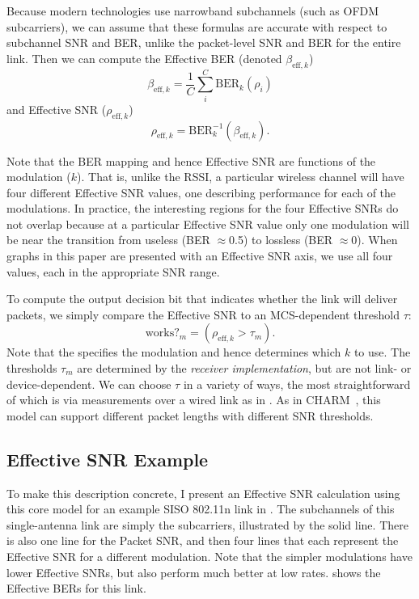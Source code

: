 Because modern technologies use narrowband subchannels (such as OFDM subcarriers), we can assume that these formulas are accurate with respect to subchannel SNR and BER, unlike the packet-level SNR and BER for the entire link. Then we can compute the Effective BER (denoted $\beta_{\text{eff},k}$)
\begin{equation}
	\label{eq:effective_ber}
	\beta_{\text{eff},k} = \frac{1}{C} \sum_{i}^{C} \text{BER}_k(\rho_i)
\end{equation}
and Effective SNR ($\rho_{\text{eff},k}$)
\begin{equation}
	\label{eq:effective_snr}
	\rho_{\text{eff},k} = \text{BER}_k^{-1}(\beta_{\text{eff},k}).
\end{equation}

Note that the BER mapping and hence Effective SNR are functions of the modulation ($k$). That is, unlike the RSSI, a particular wireless channel will have four different Effective SNR values, one describing performance for each of the modulations. In practice, the interesting regions for the four Effective SNRs do not overlap because at a particular Effective SNR value only one modulation will be near the transition from useless (BER $\approx$0.5) to lossless (BER $\approx$0). When graphs in this paper are presented with an Effective SNR axis, we use all four values, each in the appropriate SNR range.

To compute the output decision bit that indicates whether the link will deliver packets, we simply compare the Effective SNR to an MCS-dependent threshold $\tau$:
\begin{equation}
\label{eq:threshold}
\text{works?}_m = (\rho_{\text{eff},k} > \tau_m).
\end{equation}
Note that the  specifies the modulation and hence determines which $k$ to use. The thresholds $\tau_m$ are determined by the \emph{receiver implementation}, but are not link- or device-dependent. We can choose $\tau$ in a variety of ways, the most straightforward of which is via measurements over a wired link as in . As in CHARM~\cite{Judd_CHARM}, this model can support different packet lengths with different SNR thresholds.

\subsection{Effective SNR Example}
To make this description concrete, I present an Effective SNR calculation using this core model for an example SISO 802.11n link in .  The subchannels of this single-antenna link are simply the subcarriers, illustrated by the solid line. There is also one line for the Packet SNR, and then four lines that each represent the Effective SNR for a different modulation. Note that the simpler modulations have lower Effective SNRs, but also perform much better at low rates.  shows the Effective BERs for this link.

